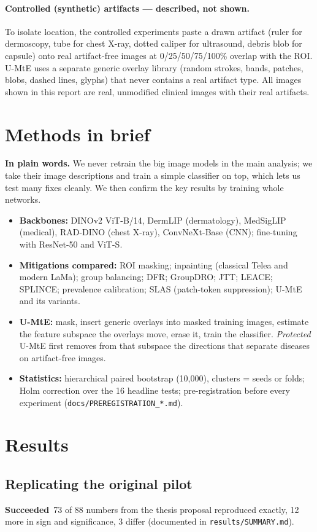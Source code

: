 \documentclass[11pt,a4paper]{article}
\newcommand{\plain}[1]{\par\noindent\colorbox{blue!6}{\parbox{\dimexpr\linewidth-2\fboxsep}{\textbf{In plain words.} #1}}\par\medskip}
\newcommand{\ok}{\textcolor{green!50!black}{\textbf{Succeeded}}}
\begin{document}
\paragraph{Controlled (synthetic) artifacts --- described, not shown.} To isolate location, the controlled experiments
paste a drawn artifact (ruler for dermoscopy, tube for chest X-ray, dotted caliper for ultrasound, debris blob for capsule)
onto real artifact-free images at 0/25/50/75/100\% overlap with the ROI. U-MtE uses a separate generic overlay library
(random strokes, bands, patches, blobs, dashed lines, glyphs) that never contains a real artifact type. All images shown
in this report are real, unmodified clinical images with their real artifacts.

\section{Methods in brief}
\plain{We never retrain the big image models in the main analysis; we take their image descriptions and train a simple
classifier on top, which lets us test many fixes cleanly. We then confirm the key results by training whole networks.}
\begin{itemize}[leftmargin=*]
\item \textbf{Backbones:} DINOv2 ViT-B/14, DermLIP (dermatology), MedSigLIP (medical), RAD-DINO (chest X-ray),
ConvNeXt-Base (CNN); fine-tuning with ResNet-50 and ViT-S.
\item \textbf{Mitigations compared:} ROI masking; inpainting (classical Telea and modern LaMa); group balancing;
DFR; GroupDRO; JTT; LEACE; SPLINCE; prevalence calibration; SLAS (patch-token suppression); U-MtE and its variants.
\item \textbf{U-MtE:} mask, insert generic overlays into masked training images, estimate the feature subspace the
overlays move, erase it, train the classifier. \emph{Protected} U-MtE first removes from that subspace the directions
that separate diseases on artifact-free images.
\item \textbf{Statistics:} hierarchical paired bootstrap (10,000), clusters = seeds or folds; Holm correction over the
16 headline tests; pre-registration before every experiment (\texttt{docs/PREREGISTRATION\_*.md}).
\end{itemize}

\section{Results}
\subsection{Replicating the original pilot}
\ok\ 73 of 88 numbers from the thesis proposal reproduced exactly, 12 more in sign and significance, 3 differ
(documented in \texttt{results/SUMMARY.md}).
\end{document}
